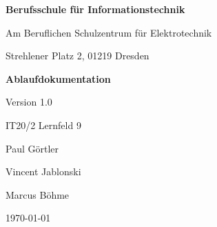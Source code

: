 \documentclass{scrartcl}
\begin{document}
\begin{center}
    \thispagestyle{empty}
    \textbf{Berufsschule für Informationstechnik}

    Am Beruflichen Schulzentrum für Elektrotechnik

    Strehlener Platz 2, 01219 Dresden
    
    \vfill 
        \LARGE{\textbf{Ablaufdokumentation}}
        \linebreak
        
        \large{Version 1.0}
        \linebreak
        \linebreak

        \large{IT20/2}
        \linebreak
        \large{Lernfeld 9}
        \linebreak
        \linebreak

        \large{Paul Görtler}
        
        \large{Vincent Jablonski}  

        \large{Marcus Böhme}  
        \linebreak

        \large \today
    \vfill    
\end{center}
\newpage
\setcounter{page}{1}

\tableofcontents
\newpage
\end{document}

